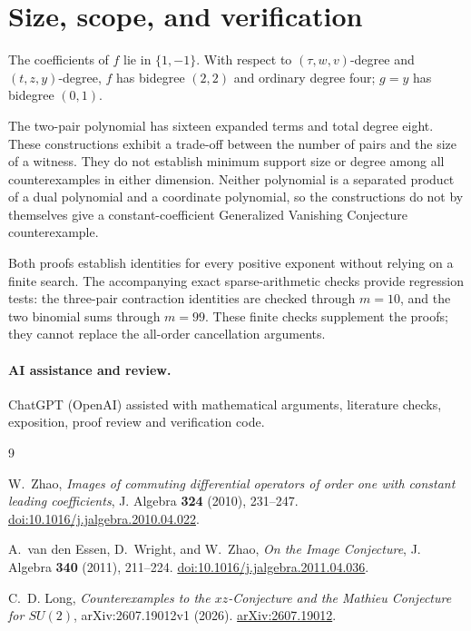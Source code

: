 \documentclass[11pt]{article}
\begin{document}
\section{Size, scope, and verification}

The coefficients of \(f\) lie in \(\{1,-1\}\).  With respect to
\((\tau,w,v)\)-degree and \((t,z,y)\)-degree, \(f\) has bidegree
\((2,2)\) and ordinary degree four; \(g=y\) has bidegree \((0,1)\).

The two-pair polynomial has sixteen expanded terms and total degree
eight. These constructions exhibit a trade-off between the number of
pairs and the size of a witness. They do not establish minimum support
size or degree among all counterexamples in either dimension. Neither
polynomial is a separated product of a dual polynomial and a coordinate
polynomial, so the constructions do not by themselves give a
constant-coefficient Generalized Vanishing Conjecture counterexample.

Both proofs establish identities for every positive exponent without
relying on a finite search. The accompanying exact sparse-arithmetic
checks provide regression tests: the three-pair contraction identities
are checked through \(m=10\), and the two binomial sums through
\(m=99\). These finite checks supplement the proofs; they cannot replace
the all-order cancellation arguments.

\paragraph{AI assistance and review.}
ChatGPT (OpenAI) assisted with mathematical arguments, literature checks,
exposition, proof review and verification code.

\begin{thebibliography}{9}
\small

W.~Zhao,
\emph{Images of commuting differential operators of order one with
constant leading coefficients},
J. Algebra \textbf{324} (2010), 231--247.
\href{https://doi.org/10.1016/j.jalgebra.2010.04.022}
{doi:10.1016/j.jalgebra.2010.04.022}.

A.~van den Essen, D.~Wright, and W.~Zhao,
\emph{On the Image Conjecture},
J. Algebra \textbf{340} (2011), 211--224.
\href{https://doi.org/10.1016/j.jalgebra.2011.04.036}
{doi:10.1016/j.jalgebra.2011.04.036}.

C.~D. Long,
\emph{Counterexamples to the \(xz\)-Conjecture and the Mathieu Conjecture
for \(SU(2)\)},
arXiv:2607.19012v1 (2026).
\href{https://arxiv.org/abs/2607.19012}
{arXiv:2607.19012}.

\end{thebibliography}
\end{document}

